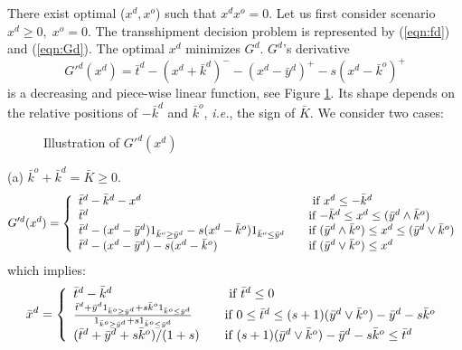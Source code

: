 \documentclass[mnsc,nonblindrev,copyedit]{informs2_wz} %
\begin{document}
There exist optimal ($x^d,x^o$) such that $x^dx^o =0$.  Let us first consider scenario $x^d \geq 0, \;x^o =0$.  The transshipment decision problem is represented by (\ref{eqn:fd}) and (\ref{eqn:Gd}).  The optimal $x^d$ minimizes $G^d$.  $G^d$'s derivative
\begin{equation}
G'^d(x^d) = \bar{t}^d - (x^d+\bar{k}^d )^- -(x^d - \bar{y}^d)^+
-s(x^d-\bar{k}^o)^+
\end{equation}
is a decreasing and piece-wise linear function, see Figure \ref{fig:xdPrice}.  Its shape depends on the relative positions of $-\bar{k}^d$ and $\bar{k}^o$, {\it i.e.}, the sign of $\bar{K}$.  We consider two cases:
\begin{figure} [ht]
\begin{center}
\end{center}
\caption{Illustration of $G'^d(x^d)$}\label{fig:xdPrice}
\end{figure}

\noindent (a) $\bar{k}^o + \bar{k}^d = \bar{K} \geq 0$.
\begin{equation} G'^d(x^d) = \left\{
  \begin{array} {ll}
  \bar{t}^d -\bar{k}^d -x^d  \quad & \mbox{ if $x^d \leq -\bar{k}^d
  $} \\
\bar{t}^d  \quad  & \mbox{if $-\bar{k}^d \leq x^d \leq
(\bar{y}^d\wedge
\bar{k}^o) $} \\
\bar{t}^d  -(x^d - \bar{y}^d)1_{\bar{k}^o \geq \bar{y}^d}-s(x^d -
\bar{k}^o)1_{\bar{k}^o \leq \bar{y}^d} \quad  & \mbox{if $
(\bar{y}^d\wedge
\bar{k}^o) \leq x^d \leq (\bar{y}^d \vee \bar{k}^o)   $}\\
\bar{t}^d  -(x^d - \bar{y}^d)-s(x^d - \bar{k}^o) \quad  & \mbox{if
$(\bar{y}^d\vee \bar{k}^o) \leq x^d$}
  \end{array} \right.
\end{equation}
which implies:
\begin{equation}
\bar{x}^d = \left\{
  \begin{array} {ll}
  \bar{t}^d -\bar{k}^d \quad & \mbox{ if $\bar{t}^d \leq 0$} \\
\frac{\bar{t}^d  + \bar{y}^d1_{\bar{k}^o \geq
\bar{y}^d}+s\bar{k}^o1_{\bar{k}^o \leq \bar{y}^d}}{1_{\bar{k}^o
\geq \bar{y}^d}+s1_{\bar{k}^o \leq \bar{y}^d}} \quad  & \mbox{if
$0 \leq \bar{t}^d \leq (s+1)(\bar{y}^d\vee \bar{k}^o)-\bar{y}^d -
s\bar{k}^o
$}\\
(\bar{t}^d  + \bar{y}^d+s\bar{k}^o)/(1+s) \quad  & \mbox{if $
(s+1)(\bar{y}^d\vee \bar{k}^o)-\bar{y}^d - s\bar{k}^o \leq
\bar{t}^d $}
  \end{array} \right.  \label{eqn:barXd1}
\end{equation}
\end{document}
